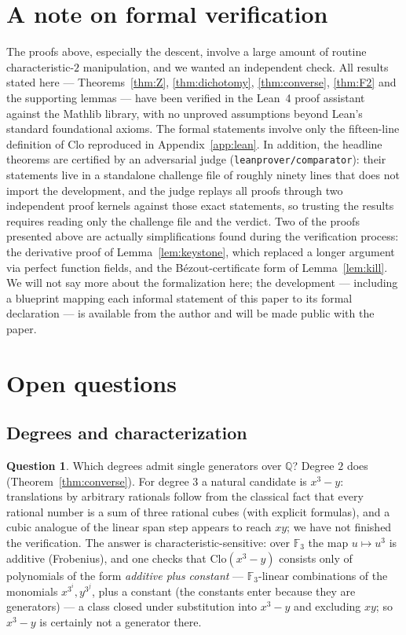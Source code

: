 \documentclass[11pt]{article}
\theoremstyle{definition}
\newtheorem{question}[theorem]{Question}
\theoremstyle{remark}
\newcommand{\F}{\mathbb{F}}
\newcommand{\Q}{\mathbb{Q}}
\newcommand{\Clo}{\mathrm{Clo}}
\begin{document}
\section{A note on formal verification}\label{sec:lean}

The proofs above, especially the descent, involve a large amount of
routine characteristic-$2$ manipulation, and we wanted an independent
check.  All results stated here --- Theorems~\ref{thm:Z}, \ref{thm:dichotomy}, \ref{thm:converse},
\ref{thm:F2} and the supporting lemmas --- have
been verified in the Lean~4 proof assistant against the Mathlib
library, with no unproved assumptions beyond Lean's standard
foundational axioms.  The formal statements involve only the
fifteen-line definition of $\Clo$ reproduced in
Appendix~\ref{app:lean}.  In addition, the headline theorems are
certified by an adversarial judge (\texttt{leanprover/comparator}):
their statements live in a standalone challenge file of roughly
ninety lines that does not import the development, and the judge
replays all proofs through two independent proof kernels against
those exact statements, so trusting the results requires reading only
the challenge file and the verdict.  Two of the proofs presented above are
actually simplifications found during the verification process: the
derivative proof of Lemma~\ref{lem:keystone}, which
replaced a longer argument via perfect function fields, and the
B\'ezout-certificate form of Lemma~\ref{lem:kill}.  We will not say more
about the formalization here; the development --- including a
blueprint mapping each informal statement of this paper to its formal
declaration --- is available from the author and will be made public
with the paper.

\section{Open questions}\label{sec:open}

\subsection*{Degrees and characterization}

\begin{question}
Which degrees admit single generators over $\Q$?  Degree $2$ does
(Theorem~\ref{thm:converse}).  For degree $3$ a natural candidate is
$x^3 - y$: translations by arbitrary rationals follow from the
classical fact that every rational number is a sum of three rational
cubes (with explicit formulas), and a cubic analogue of the linear
span step appears to reach $xy$; we have not finished the
verification.  The answer is characteristic-sensitive: over $\F_3$
the map $u \mapsto u^3$ is additive (Frobenius), and one checks that
$\Clo(x^3 - y)$ consists only of polynomials of the form
\emph{additive plus constant} --- $\F_3$-linear combinations of the
monomials $x^{3^i}, y^{3^j}$, plus a constant (the constants enter
because they are generators) --- a class closed under substitution
into $x^3 - y$ and excluding $xy$; so $x^3 - y$ is certainly not a
generator there.
\end{question}
\end{document}
